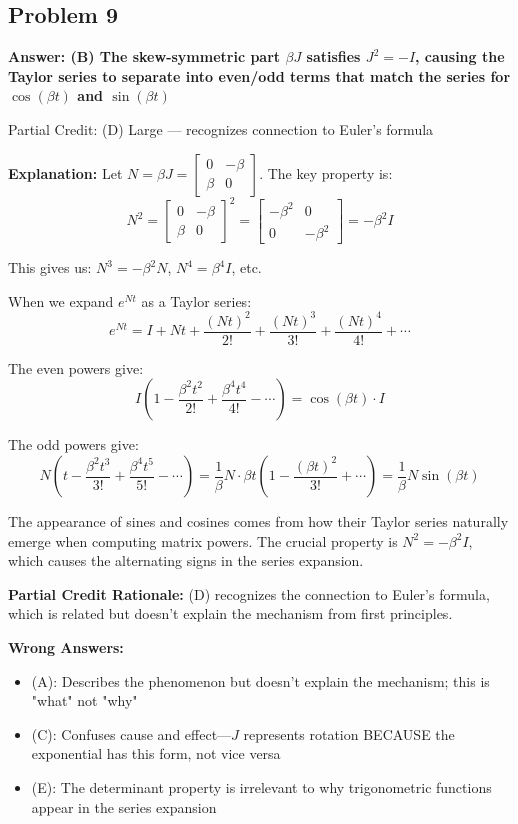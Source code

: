\documentclass[12pt]{amsart}
\newcommand{\correct}[1]{{\color{correctgreen}\textbf{#1}}}
\newcommand{\partcred}[1]{{\color{partialblue}#1}}
\begin{document}
\subsection*{Problem 9}
\correct{Answer: (B) The skew-symmetric part $\beta J$ satisfies $J^2 = -I$, causing the Taylor series to separate into even/odd terms that match the series for $\cos(\beta t)$ and $\sin(\beta t)$}

\partcred{Partial Credit: (D) Large — recognizes connection to Euler's formula}

\textbf{Explanation:} Let $N = \beta J = \begin{bmatrix} 0 & -\beta \\ \beta & 0 \end{bmatrix}$. The key property is:
$$N^2 = \begin{bmatrix} 0 & -\beta \\ \beta & 0 \end{bmatrix}^2 = \begin{bmatrix} -\beta^2 & 0 \\ 0 & -\beta^2 \end{bmatrix} = -\beta^2 I$$

This gives us: $N^3 = -\beta^2 N$, $N^4 = \beta^4 I$, etc.

When we expand $e^{Nt}$ as a Taylor series:
$$e^{Nt} = I + Nt + \frac{(Nt)^2}{2!} + \frac{(Nt)^3}{3!} + \frac{(Nt)^4}{4!} + \cdots$$

The even powers give:
$$I\left(1 - \frac{\beta^2t^2}{2!} + \frac{\beta^4t^4}{4!} - \cdots\right) = \cos(\beta t) \cdot I$$

The odd powers give:
$$N\left(t - \frac{\beta^2t^3}{3!} + \frac{\beta^4t^5}{5!} - \cdots\right) = \frac{1}{\beta}N \cdot \beta t\left(1 - \frac{(\beta t)^2}{3!} + \cdots\right) = \frac{1}{\beta}N\sin(\beta t)$$

The appearance of sines and cosines comes from how their Taylor series naturally emerge when computing matrix powers. The crucial property is $N^2 = -\beta^2 I$, which causes the alternating signs in the series expansion.

\textbf{Partial Credit Rationale:} (D) recognizes the connection to Euler's formula, which is related but doesn't explain the mechanism from first principles.

\textbf{Wrong Answers:}
\begin{itemize}
\item (A): Describes the phenomenon but doesn't explain the mechanism; this is "what" not "why"
\item (C): Confuses cause and effect—$J$ represents rotation BECAUSE the exponential has this form, not vice versa
\item (E): The determinant property is irrelevant to why trigonometric functions appear in the series expansion
\end{itemize}
\end{document}
